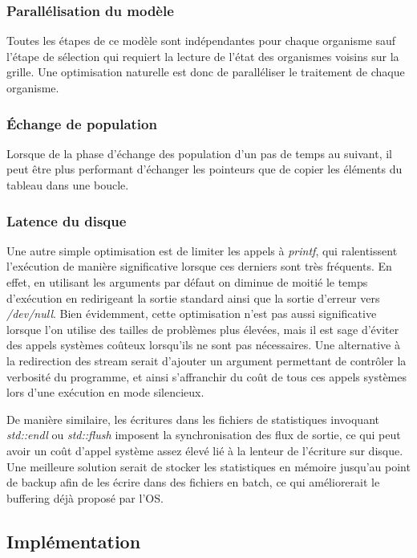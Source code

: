 \documentclass[a4paper, 10pt, twoside]{article}
\begin{document}
\subsubsection*{Parallélisation du modèle}

Toutes les étapes de ce modèle sont indépendantes pour chaque organisme sauf l'étape de sélection qui requiert la lecture de l'état des organismes voisins sur la grille. Une optimisation naturelle est donc de paralléliser le traitement de chaque organisme\label{parallel/orga}.

\subsubsection*{Échange de population}

Lorsque de la phase d'échange des population d'un pas de temps au suivant, il peut être plus performant d'échanger les pointeurs que de copier les éléments du tableau dans une boucle.

\subsubsection*{Latence du disque}

Une autre simple optimisation est de limiter les appels à \textit{printf}, qui ralentissent l'exécution de manière significative lorsque ces derniers sont très fréquents. En effet, en utilisant les arguments par défaut on diminue de moitié le temps d'exécution en redirigeant la sortie standard ainsi que la sortie d'erreur vers \textit{/dev/null}. Bien évidemment, cette optimisation n'est pas aussi significative lorsque l'on utilise des tailles de problèmes plus élevées, mais il est sage d'éviter des appels systèmes coûteux lorsqu'ils ne sont pas nécessaires. Une alternative à la redirection des stream serait d'ajouter un argument permettant de contrôler la verbosité du programme, et ainsi s'affranchir du coût de tous ces appels systèmes lors d'une exécution en mode silencieux.

De manière similaire, les écritures dans les fichiers de statistiques invoquant \textit{std::endl} ou \textit{std::flush} imposent la synchronisation des flux de sortie, ce qui peut avoir un coût d'appel système assez élevé lié à la lenteur de l'écriture sur disque. Une meilleure solution serait de stocker les statistiques en mémoire jusqu'au point de backup afin de les écrire dans des fichiers en batch, ce qui améliorerait le buffering déjà proposé par l'OS.

\subsection{Implémentation}
\end{document}
